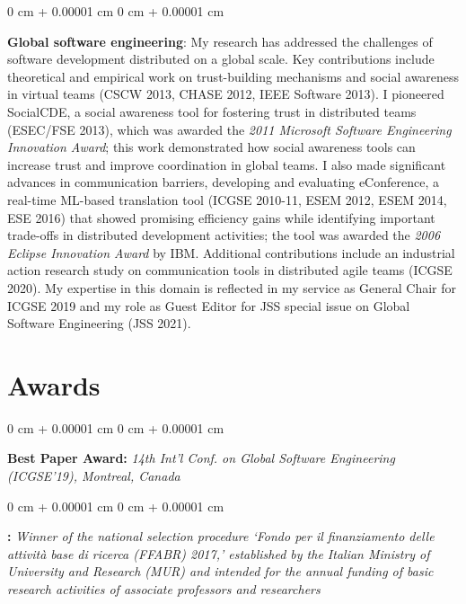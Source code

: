 \documentclass[10pt, a4paper]{article}
\newenvironment{onecolentry}{
    \begin{adjustwidth}{
        0 cm + 0.00001 cm
    }{
        0 cm + 0.00001 cm
    }
}{
    \end{adjustwidth}
} %
\let\hrefWithoutArrow\href
\renewcommand{\href}[2]{\hrefWithoutArrow{#1}{\ifthenelse{\equal{#2}{}}{ }{#2 }\raisebox{.15ex}{\footnotesize \faExternalLink*}}}
\begin{document}
        \begin{onecolentry}
            \textbf{Global software engineering}: My research has addressed the challenges of software development distributed on a global scale. Key contributions include theoretical and empirical work on trust-building mechanisms and social awareness in virtual teams (CSCW 2013, CHASE 2012, IEEE Software 2013). I pioneered SocialCDE, a social awareness tool for fostering trust in distributed teams (ESEC/FSE 2013), which was awarded the \textit{2011 Microsoft Software Engineering Innovation Award}; this work demonstrated how social awareness tools can increase trust and improve coordination in global teams. I also made significant advances in communication barriers, developing and evaluating eConference, a real-time ML-based translation tool (ICGSE 2010-11, ESEM 2012, ESEM 2014, ESE 2016) that showed promising efficiency gains while identifying important trade-offs in distributed development activities; the tool was awarded the \textit{2006 Eclipse Innovation Award} by IBM. Additional contributions include an industrial action research study on communication tools in distributed agile teams (ICGSE 2020). My expertise in this domain is reflected in my service as General Chair for ICGSE 2019 and my role as Guest Editor for JSS special issue on Global Software Engineering (JSS 2021).
        \end{onecolentry}


    
    \section{Awards}



        
        \begin{onecolentry}
            \textbf{Best Paper Award:} \textit{14th Int'l Conf. on Global Software Engineering (ICGSE'19), Montreal, Canada}
        \end{onecolentry}

        \vspace{0.2 cm}

        \begin{onecolentry}
            \textbf{\href{https://www.anvur.it/wp-content/uploads/2018/05/Beneficiari_FFABR_Ricercatori.pdf}{FABBR 2017 Award}:} \textit{Winner of the national selection procedure `Fondo per il finanziamento delle attività base di ricerca (FFABR) 2017,' established by the Italian Ministry of University and Research (MUR) and intended for the annual funding of basic research activities of associate professors and researchers}
        \end{onecolentry}
\end{document}
